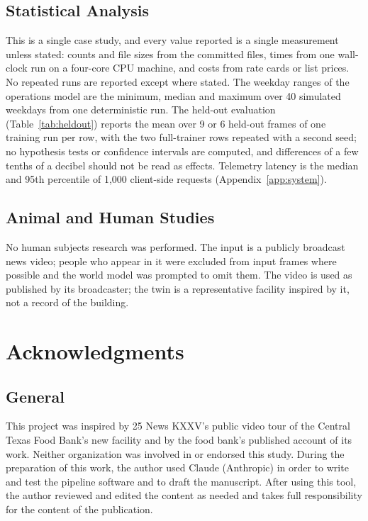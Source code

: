 \documentclass{article}
\begin{document}
\subsection{Statistical Analysis}
This is a single case study, and every value reported is a single measurement unless stated:
counts and file sizes from the committed files, times from one wall-clock run on
a four-core CPU machine, and costs from rate cards or list prices. No repeated
runs are reported except where stated. The weekday ranges
of the operations model are the minimum, median and maximum over 40 simulated
weekdays from one deterministic run. The held-out evaluation
(Table~\ref{tab:heldout}) reports the mean over 9 or 6 held-out frames of one
training run per row, with the two full-trainer rows repeated with a second
seed; no hypothesis tests or confidence intervals are
computed, and differences of a few tenths of a decibel should not be read as
effects. Telemetry latency is the median and 95th percentile of 1{,}000
client-side requests (Appendix~\ref{app:system}).

\subsection{Animal and Human Studies}
No human subjects research was performed. The input is a publicly broadcast
news video; people who appear in it were excluded from input frames where
possible and the world model was prompted to omit them. The video is used as
published by its broadcaster; the twin is a representative facility inspired
by it, not a record of the building.

\section*{Acknowledgments}

\subsection*{General}
This project was inspired by 25 News KXXV's public video tour of the Central
Texas Food Bank's new facility \cite{kxxv2026ctfb,kxxv2026waco} and by the
food bank's published account of its work. Neither organization was involved
in or endorsed this study. During the preparation of this work, the author used Claude
(Anthropic) in order to write and test the pipeline software and to draft the
manuscript. After using this tool, the author reviewed and edited the content
as needed and takes full responsibility for the content of the publication.
\end{document}
